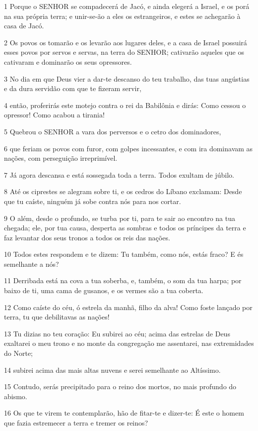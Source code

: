 \par 1 Porque o SENHOR se compadecerá de Jacó, e ainda elegerá a Israel, e os porá na sua própria terra; e unir-se-ão a eles os estrangeiros, e estes se achegarão à casa de Jacó.
\par 2 Os povos os tomarão e os levarão aos lugares deles, e a casa de Israel possuirá esses povos por servos e servas, na terra do SENHOR; cativarão aqueles que os cativaram e dominarão os seus opressores.
\par 3 No dia em que Deus vier a dar-te descanso do teu trabalho, das tuas angústias e da dura servidão com que te fizeram servir,
\par 4 então, proferirás este motejo contra o rei da Babilônia e dirás: Como cessou o opressor! Como acabou a tirania!
\par 5 Quebrou o SENHOR a vara dos perversos e o cetro dos dominadores,
\par 6 que feriam os povos com furor, com golpes incessantes, e com ira dominavam as nações, com perseguição irreprimível.
\par 7 Já agora descansa e está sossegada toda a terra. Todos exultam de júbilo.
\par 8 Até os ciprestes se alegram sobre ti, e os cedros do Líbano exclamam: Desde que tu caíste, ninguém já sobe contra nós para nos cortar.
\par 9 O além, desde o profundo, se turba por ti, para te sair ao encontro na tua chegada; ele, por tua causa, desperta as sombras e todos os príncipes da terra e faz levantar dos seus tronos a todos os reis das nações.
\par 10 Todos estes respondem e te dizem: Tu também, como nós, estás fraco? E és semelhante a nós?
\par 11 Derribada está na cova a tua soberba, e, também, o som da tua harpa; por baixo de ti, uma cama de gusanos, e os vermes são a tua coberta.
\par 12 Como caíste do céu, ó estrela da manhã, filho da alva! Como foste lançado por terra, tu que debilitavas as nações!
\par 13 Tu dizias no teu coração: Eu subirei ao céu; acima das estrelas de Deus exaltarei o meu trono e no monte da congregação me assentarei, nas extremidades do Norte;
\par 14 subirei acima das mais altas nuvens e serei semelhante ao Altíssimo.
\par 15 Contudo, serás precipitado para o reino dos mortos, no mais profundo do abismo.
\par 16 Os que te virem te contemplarão, hão de fitar-te e dizer-te: É este o homem que fazia estremecer a terra e tremer os reinos?
